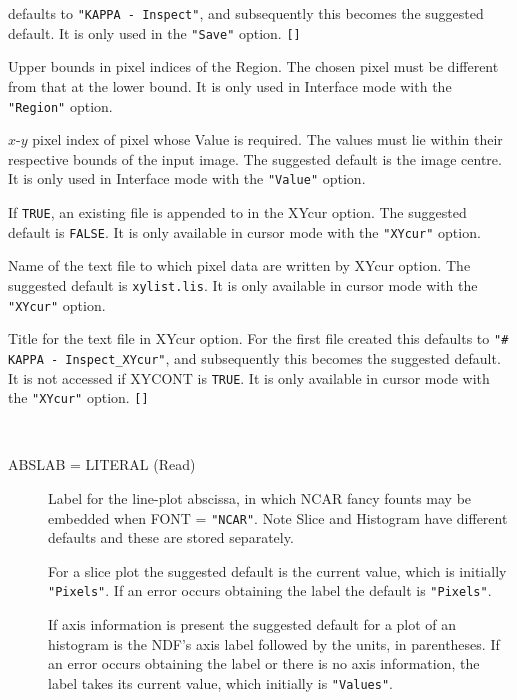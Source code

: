 \documentclass[twoside,11pt]{article}
\newcommand{\sstgraphparameters}[1]{
   \goodbreak 
   \item[Graphics-style Parameters:] \mbox{} \\
   \vspace{-3.5ex}
   \begin{description}
      #1
   \end{description}
}
\newcommand{\sstsubsection}[1]{ \item[{#1}] \mbox{} \\}
\renewcommand{\sstsubsection}[1]{\item[{#1}]}
\begin{document}
{{{         defaults to {\tt "KAPPA - Inspect"}, and subsequently this becomes
         the suggested default.  It is only used in the {\tt "Save"} option.
         {\tt []}
      }
      \sstsubsection{
         UBOUND( 2 ) = \_INTEGER (Read)
      }{
         Upper bounds in pixel indices of the Region.  The chosen pixel
         must be different from that at the lower bound.  It is only
         used in Interface mode with the {\tt "Region"} option.
      }
      \sstsubsection{
         VAIND( 2 ) = \_INTEGER (Read)
      }{
         $x$-$y$ pixel index of pixel whose Value is required.  The values
         must lie within their respective bounds of the input image.
         The suggested default is the image centre.  It is only used in
         Interface mode with the {\tt "Value"} option.
      }
      \sstsubsection{
         XYCONT = \_LOGICAL (Read)
      }{
         If {\tt TRUE}, an existing file is appended to in the XYcur option.
         The suggested default is {\tt FALSE}.  It is only available in
         cursor mode with the {\tt "XYcur"} option.
      }
      \sstsubsection{
         XYFILE = FILENAME (Update)
      }{
         Name of the text file to which pixel data are written by
         XYcur option.  The suggested default is {\tt xylist.lis}.  It is
         only available in cursor mode with the {\tt "XYcur"} option.
      }
      \sstsubsection{
         XYTITLE = LITERAL (Read)
      }{
         Title for the text file in XYcur option.  For the first file
         created this defaults to {\tt "\# KAPPA - Inspect\_XYcur"}, and
         subsequently this becomes the suggested default. It is not
         accessed if XYCONT is {\tt TRUE}.   It is only available in cursor
         mode with the {\tt "XYcur"} option. {\tt []}
      }
   }
   \sstgraphparameters{
      \sstsubsection{
         ABSLAB  =  LITERAL (Read)
      }{
         Label for the line-plot abscissa, in which NCAR fancy founts
         may be embedded when FONT = {\tt "NCAR"}.  Note Slice and
         Histogram have different defaults and these are stored separately.

         For a slice plot the suggested default is the current value,
         which is initially {\tt "Pixels"}.  If an error occurs obtaining the
         label the default is {\tt "Pixels"}.

         If axis information is present the suggested default for a
         plot of an histogram is the NDF's axis label followed by the
         units, in parentheses.  If an error occurs obtaining the label
         or there is no axis information, the label takes its current
         value, which initially is {\tt "Values"}.

}}}
\end{document}
